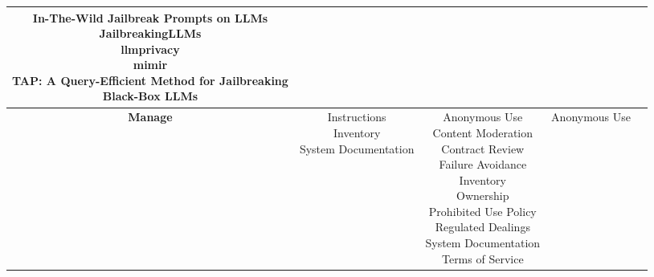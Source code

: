 \documentclass[fleqn]{article}
\begin{document}
\begin{landscape}
\begin{table}[H]
\begin{tabular}{|c|c|c|c|c|}
{			\textbullet\hspace{3pt} In-The-Wild Jailbreak Prompts on LLMs \\ 
			\textbullet\hspace{3pt} JailbreakingLLMs \\ 
			\textbullet\hspace{3pt} llmprivacy \\ 
			\textbullet\hspace{3pt} mimir \\ 
			\textbullet\hspace{3pt} TAP: A Query-Efficient Method for Jailbreaking \\\hspace{10pt}Black-Box LLMs \\ 
		}			
		\\
		\hline		
		\textbf{Manage} &
		\makecell[l]{
			\textbullet\hspace{3pt} Instructions\\ 	
			\textbullet\hspace{3pt} Inventory\\ 
			\textbullet\hspace{3pt} System Documentation\\ 	
		}
		& 
		\makecell[l]{
			\textbullet\hspace{3pt} Anonymous Use\\ 	
			\textbullet\hspace{3pt} Content Moderation\\ 	
			\textbullet\hspace{3pt} Contract Review\\ 	
			\textbullet\hspace{3pt} Failure Avoidance\\ 	
			\textbullet\hspace{3pt} Inventory\\ 	
			\textbullet\hspace{3pt} Ownership\\ 	
			\textbullet\hspace{3pt} Prohibited Use Policy\\ 	
			\textbullet\hspace{3pt} Regulated Dealings\\ 	
			\textbullet\hspace{3pt} System Documentation\\ 	
			\textbullet\hspace{3pt} Terms of Service\\ 	
		}
		&
		\makecell[l]{ 	
			\textbullet\hspace{3pt} Anonymous Use\\ 	
}
\end{tabular}
\end{table}
\end{landscape}
\end{document}
